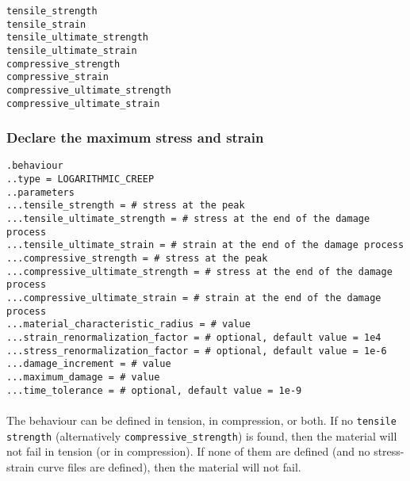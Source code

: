 \documentclass[10pt]{article}
\begin{document}
\noindent \verb+tensile_strength+\\
\verb+tensile_strain+\\
\verb+tensile_ultimate_strength+\\
\verb+tensile_ultimate_strain+\\
\verb+compressive_strength+\\
\verb+compressive_strain+\\
\verb+compressive_ultimate_strength+\\
\verb+compressive_ultimate_strain+

\subsubsection{Declare the maximum stress and strain}

\noindent \verb+.behaviour+\\
\verb+..type = LOGARITHMIC_CREEP+\\
\verb+..parameters+\\
\verb+...tensile_strength = # stress at the peak+\\
\verb+...tensile_ultimate_strength = # stress at the end of the damage process+\\
\verb+...tensile_ultimate_strain = # strain at the end of the damage process+\\
\verb+...compressive_strength = # stress at the peak+\\
\verb+...compressive_ultimate_strength = # stress at the end of the damage process+\\
\verb+...compressive_ultimate_strain = # strain at the end of the damage process+\\
\verb+...material_characteristic_radius = # value+\\
\verb+...strain_renormalization_factor = # optional, default value = 1e4+\\
\verb+...stress_renormalization_factor = # optional, default value = 1e-6+\\
\verb+...damage_increment = # value+\\
\verb+...maximum_damage = # value+\\
\verb+...time_tolerance = # optional, default value = 1e-9+

\paragraph{}The behaviour can be defined in tension, in compression, or both. If no \verb+tensile strength+ (alternatively \verb+compressive_strength+) is found, then the material will not fail in tension (or in compression). If none of them are defined (and no stress-strain curve files are defined), then the material will not fail.
\end{document}
